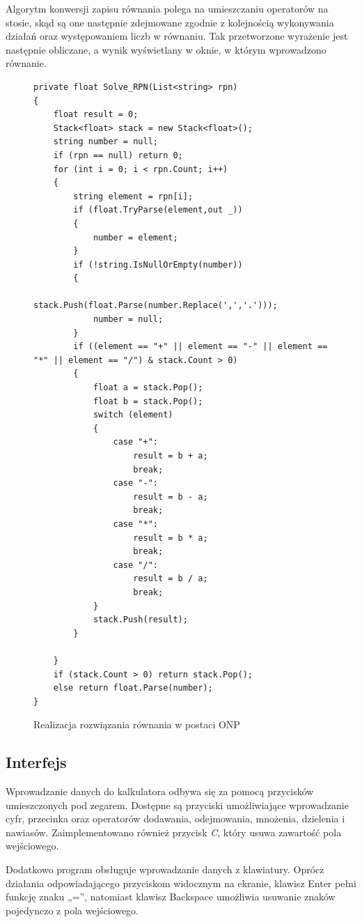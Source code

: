 \documentclass{article}
\begin{document}
Algorytm konwersji zapisu równania polega na umieszczaniu operatorów na stosie, skąd są one następnie zdejmowane zgodnie z kolejnością wykonywania działań oraz występowaniem liczb w równaniu. Tak przetworzone wyrażenie jest następnie obliczane, a wynik wyświetlany w oknie, w którym wprowadzono równanie.

\begin{figure}
\begin{lstlisting}[style=csharp]
private float Solve_RPN(List<string> rpn)
{
    float result = 0;
    Stack<float> stack = new Stack<float>();
    string number = null;
    if (rpn == null) return 0;
    for (int i = 0; i < rpn.Count; i++)
    {
        string element = rpn[i];
        if (float.TryParse(element,out _))
        {
            number = element;
        }
        if (!string.IsNullOrEmpty(number))
        {
            stack.Push(float.Parse(number.Replace(',','.')));
            number = null;
        }
        if ((element == "+" || element == "-" || element == "*" || element == "/") & stack.Count > 0)
        {
            float a = stack.Pop();
            float b = stack.Pop();
            switch (element)
            {
                case "+":
                    result = b + a;
                    break;
                case "-":
                    result = b - a;
                    break;
                case "*":
                    result = b * a;
                    break;
                case "/":
                    result = b / a;
                    break;
            }
            stack.Push(result);
        }
        
    }
    if (stack.Count > 0) return stack.Pop();
    else return float.Parse(number);
}
\end{lstlisting}
\caption{Realizacja rozwiązania równania w postaci ONP}
\end{figure}
\subsection{Interfejs}
Wprowadzanie danych do kalkulatora odbywa się za pomocą przycisków umieszczonych pod zegarem. Dostępne są przyciski umożliwiające wprowadzanie cyfr, przecinka oraz operatorów dodawania, odejmowania, mnożenia, dzielenia i nawiasów. Zaimplementowano również przycisk \emph{C}, który usuwa zawartość pola wejściowego.

Dodatkowo program obsługuje wprowadzanie danych z klawiatury. Oprócz działania odpowiadającego przyciskom widocznym na ekranie, klawisz Enter pełni funkcję znaku „=”, natomiast klawisz Backspace umożliwia usuwanie znaków pojedynczo z pola wejściowego.
\end{document}
